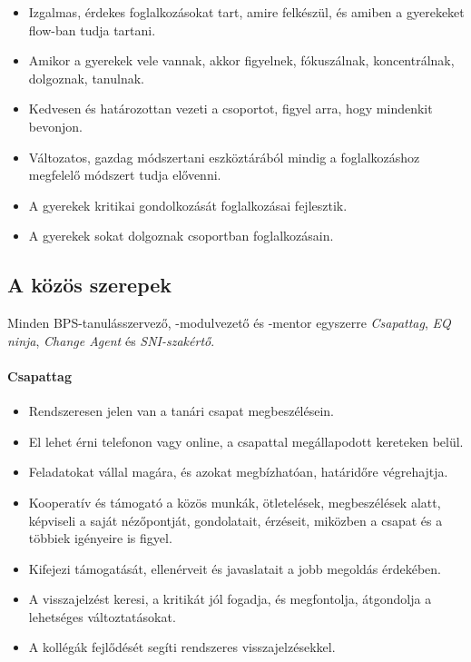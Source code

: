 \begin{itemize}

    \item
          Izgalmas, érdekes foglalkozásokat tart, amire felkészül, és amiben a gyerekeket flow-ban tudja tartani.
    \item
          Amikor a gyerekek vele vannak, akkor figyelnek, fókuszálnak, koncentrálnak, dolgoznak, tanulnak.
    \item
          Kedvesen és határozottan vezeti a csoportot, figyel arra, hogy mindenkit bevonjon.
    \item Változatos, gazdag módszertani eszköztárából mindig a foglalkozáshoz megfelelő módszert tudja elővenni.
    \item  A gyerekek kritikai gondolkozását foglalkozásai fejlesztik.
    \item A gyerekek sokat dolgoznak csoportban foglalkozásain.
    
\end{itemize}

\subsection{A közös szerepek}

Minden BPS-tanulásszervező, -modulvezető és -mentor egyszerre  \emph{Csapattag}, \emph{EQ ninja}, \emph{Change Agent} és \emph{SNI-szakértő}. 

\paragraph{Csapattag}

\begin{itemize}

    \item
          Rendszeresen jelen van a tanári csapat megbeszélésein.
    \item
          El lehet érni telefonon vagy online, a csapattal megállapodott kereteken belül.
    \item
          Feladatokat vállal magára, és azokat megbízhatóan, határidőre végrehajtja.
    \item
          Kooperatív és támogató a közös munkák, ötletelések, megbeszélések alatt, képviseli a saját nézőpontját, gondolatait, érzéseit, miközben a csapat és a többiek igényeire is figyel.
    \item
          Kifejezi támogatását, ellenérveit és javaslatait a jobb megoldás érde\-kében.
    \item
          A visszajelzést keresi, a kritikát jól fogadja, és megfontolja, átgondolja a lehetséges változtatásokat.
    \item
          A kollégák fejlődését segíti rendszeres visszajelzésekkel.
\end{itemize}

